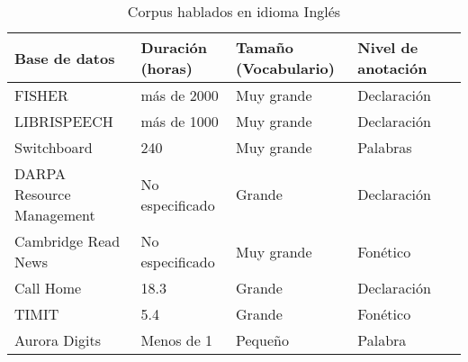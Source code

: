 \begin{table}[H]
\centering
\caption{Corpus hablados en idioma Inglés}
\label{tab:english_corpora}
\begin{tabular}{|l|l|l|l|l|}
\toprule
\textbf{Base de datos} & \textbf{Duración (horas)} & \textbf{Tamaño (Vocabulario)} & \textbf{Nivel de anotación}\\
\hline
FISHER\cite{CieriTheSpeech-to-Text}  & más de 2000 & Muy grande &  Declaración\\
\hline
LIBRISPEECH\cite{PanayotovLIBRISPEECH:BOOKS}  & más de 1000 & Muy grande &  Declaración\\
\hline

Switchboard \cite{Godfrey1992SWITCHBOARD:Development}  & 240 & Muy grande & Palabras\\
\hline
DARPA Resource Management \cite{Lucke1992ExpandingCorpus} & No especificado  & Grande & Declaración \\
\hline
Cambridge Read News \cite{RobinsonWSJCAM0:RECOGNITION}  & No especificado & Muy grande & Fonético\\
\hline
Call Home  \cite{Fu-HuaLiuSpeechCorpus} & 18.3 & Grande & Declaración\\
\hline
TIMIT \cite{PriceTheRecognition} & 5.4 & Grande & Fonético \\
\hline
Aurora Digits \cite{EvansEfficientCorpus}  & Menos de 1 & Pequeño & Palabra\\
\hline



\end{tabular}
\end{table}